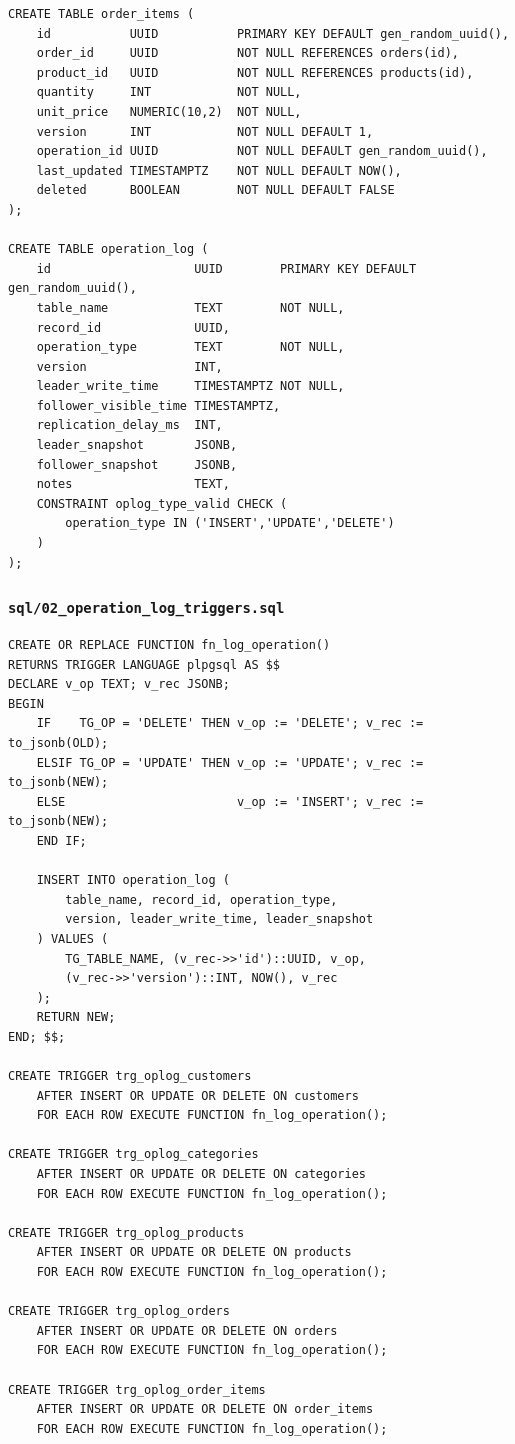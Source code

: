 \documentclass[12pt,a4paper]{article}
\begin{document}
\begin{lstlisting}[style=sqlstyle]
CREATE TABLE order_items (
    id           UUID           PRIMARY KEY DEFAULT gen_random_uuid(),
    order_id     UUID           NOT NULL REFERENCES orders(id),
    product_id   UUID           NOT NULL REFERENCES products(id),
    quantity     INT            NOT NULL,
    unit_price   NUMERIC(10,2)  NOT NULL,
    version      INT            NOT NULL DEFAULT 1,
    operation_id UUID           NOT NULL DEFAULT gen_random_uuid(),
    last_updated TIMESTAMPTZ    NOT NULL DEFAULT NOW(),
    deleted      BOOLEAN        NOT NULL DEFAULT FALSE
);

CREATE TABLE operation_log (
    id                    UUID        PRIMARY KEY DEFAULT gen_random_uuid(),
    table_name            TEXT        NOT NULL,
    record_id             UUID,
    operation_type        TEXT        NOT NULL,
    version               INT,
    leader_write_time     TIMESTAMPTZ NOT NULL,
    follower_visible_time TIMESTAMPTZ,
    replication_delay_ms  INT,
    leader_snapshot       JSONB,
    follower_snapshot     JSONB,
    notes                 TEXT,
    CONSTRAINT oplog_type_valid CHECK (
        operation_type IN ('INSERT','UPDATE','DELETE')
    )
);
\end{lstlisting}

\subsubsection{\texttt{sql/02\_operation\_log\_triggers.sql}}
\begin{lstlisting}[style=sqlstyle]
CREATE OR REPLACE FUNCTION fn_log_operation()
RETURNS TRIGGER LANGUAGE plpgsql AS $$
DECLARE v_op TEXT; v_rec JSONB;
BEGIN
    IF    TG_OP = 'DELETE' THEN v_op := 'DELETE'; v_rec := to_jsonb(OLD);
    ELSIF TG_OP = 'UPDATE' THEN v_op := 'UPDATE'; v_rec := to_jsonb(NEW);
    ELSE                        v_op := 'INSERT'; v_rec := to_jsonb(NEW);
    END IF;

    INSERT INTO operation_log (
        table_name, record_id, operation_type,
        version, leader_write_time, leader_snapshot
    ) VALUES (
        TG_TABLE_NAME, (v_rec->>'id')::UUID, v_op,
        (v_rec->>'version')::INT, NOW(), v_rec
    );
    RETURN NEW;
END; $$;

CREATE TRIGGER trg_oplog_customers
    AFTER INSERT OR UPDATE OR DELETE ON customers
    FOR EACH ROW EXECUTE FUNCTION fn_log_operation();

CREATE TRIGGER trg_oplog_categories
    AFTER INSERT OR UPDATE OR DELETE ON categories
    FOR EACH ROW EXECUTE FUNCTION fn_log_operation();

CREATE TRIGGER trg_oplog_products
    AFTER INSERT OR UPDATE OR DELETE ON products
    FOR EACH ROW EXECUTE FUNCTION fn_log_operation();

CREATE TRIGGER trg_oplog_orders
    AFTER INSERT OR UPDATE OR DELETE ON orders
    FOR EACH ROW EXECUTE FUNCTION fn_log_operation();

CREATE TRIGGER trg_oplog_order_items
    AFTER INSERT OR UPDATE OR DELETE ON order_items
    FOR EACH ROW EXECUTE FUNCTION fn_log_operation();
\end{lstlisting}
\end{document}
